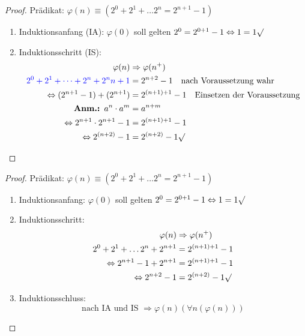 \documentclass[12pt%
,aspectratio=169%
]{beamer}
\begin{document}
\begin{frame}
\begin{proof}
Prädikat: $\varphi(n) \equiv (2^0 + 2^1 + \dots 2^n = 2^{n+1}-1)$
\begin{enumerate}
	\item Induktionsanfang (IA): $\varphi(0)$ soll gelten
$2^0 = 2^{0+1}-1 \Leftrightarrow 1 = 1 \surd$\\
	\item Induktionsschritt (IS):
\begin{align*}
\varphi(n) & \Rightarrow \varphi(n^+)\\
\color{blue}{2^0 + 2^1 + \dots + 2^n} + 2^n{n+1} &= 2^{n+2} -1 \quad\text{nach Voraussetzung wahr}\\
\Leftrightarrow  (2^{n+1} -1) + (2^{n+1}) &= 2^{(n+1)+1}-1  \quad\text{Einsetzen der Voraussetzung}\\
\textbf{Anm.: } a^n \cdot a^m &= a^{n+m}\\
\Leftrightarrow  2^{n+1} \cdot 2^{n+1} -1 &= 2^{(n+1)+1}-1\\
\Leftrightarrow  2^{(n+2)} -1 &= 2^{(n+2)}-1 \surd
\end{align*}
\end{enumerate}
\end{proof}
\end{frame}

\begin{frame}
\begin{proof}
Prädikat: $\varphi(n) \equiv (2^0 + 2^1 + \dots 2^n = 2^{n+1}-1)$
\begin{enumerate}
	\item Induktionsanfang: $\varphi(0)$ soll gelten
$2^0 = 2^{0+1}-1 \Leftrightarrow 1 = 1 \surd$\\
	\item Induktionsschritt:
\begin{align*}
\varphi(n) & \Rightarrow \varphi(n^+)\\
2^0 + 2^1 + \dots 2^n + 2^{n+1} &= 2^{(n+1)+1}-1\\
\Leftrightarrow  2^{n+1} -1 + 2^{n+1} &= 2^{(n+1)+1}-1\\
\Leftrightarrow  2^{n+2} -1 &= 2^{(n+2)}-1 \surd
\end{align*}
	\item Induktionsschluss:
$$\text{nach IA und IS } \Rightarrow \varphi(n) (\forall n(\varphi(n)))$$
\end{enumerate}
\end{proof}
\end{frame}
\end{document}
